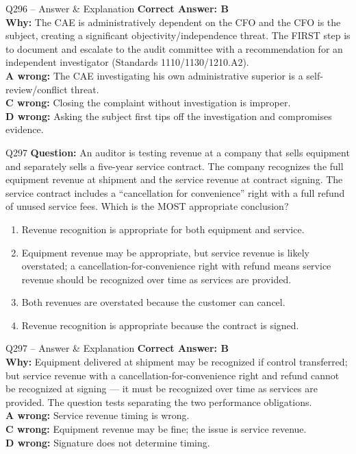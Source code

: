 \documentclass[aspectratio=169,10pt]{beamer}
\begin{document}
	\begin{frame}[t]{Q296 -- Answer \& Explanation}
		\small
		\textbf{Correct Answer: B} \\[4pt]
		\textbf{Why:} The CAE is administratively dependent on the CFO and the CFO is the subject, creating a significant objectivity/independence threat. The FIRST step is to document and escalate to the audit committee with a recommendation for an independent investigator (Standards 1110/1130/1210.A2). \\[4pt]
		\textbf{A wrong:} The CAE investigating his own administrative superior is a self-review/conflict threat. \\[2pt]
		\textbf{C wrong:} Closing the complaint without investigation is improper. \\[2pt]
		\textbf{D wrong:} Asking the subject first tips off the investigation and compromises evidence.
	\end{frame}
	
	\begin{frame}[t]{Q297}
		\small
		\textbf{Question:} An auditor is testing revenue at a company that sells equipment and separately sells a five-year service contract. The company recognizes the full equipment revenue at shipment and the service revenue at contract signing. The service contract includes a ``cancellation for convenience'' right with a full refund of unused service fees. Which is the MOST appropriate conclusion?
		\begin{enumerate}[label=\Alph*.,itemsep=1pt,topsep=2pt]
			\item Revenue recognition is appropriate for both equipment and service.
			\item Equipment revenue may be appropriate, but service revenue is likely overstated; a cancellation-for-convenience right with refund means service revenue should be recognized over time as services are provided.
			\item Both revenues are overstated because the customer can cancel.
			\item Revenue recognition is appropriate because the contract is signed.
		\end{enumerate}
	\end{frame}
	
	\begin{frame}[t]{Q297 -- Answer \& Explanation}
		\small
		\textbf{Correct Answer: B} \\[4pt]
		\textbf{Why:} Equipment delivered at shipment may be recognized if control transferred; but service revenue with a cancellation-for-convenience right and refund cannot be recognized at signing — it must be recognized over time as services are provided. The question tests separating the two performance obligations. \\[4pt]
		\textbf{A wrong:} Service revenue timing is wrong. \\[2pt]
		\textbf{C wrong:} Equipment revenue may be fine; the issue is service revenue. \\[2pt]
		\textbf{D wrong:} Signature does not determine timing.
	\end{frame}
	
\end{document}
